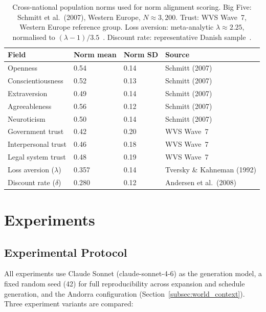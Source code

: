 \documentclass[a4paper,12pt]{article}
\begin{document}
\begin{table}[H]
\caption{Cross-national population norms used for norm alignment scoring.
Big Five: Schmitt et al.\ (2007), Western Europe, $N \approx 3{,}200$.
Trust: WVS Wave~7, Western Europe reference group.
Loss aversion: meta-analytic $\lambda \approx 2.25$, normalised to
$(\lambda - 1)/3.5$~\cite{tversky1992advances}.
Discount rate: representative Danish sample~\cite{andersen2008eliciting}.}
\label{tab:norms}
\begin{tabularx}{\textwidth}{lXXX}
\toprule
\textbf{Field} & \textbf{Norm mean} & \textbf{Norm SD} & \textbf{Source} \\
\midrule
Openness           & 0.54 & 0.14 & Schmitt (2007) \\
Conscientiousness  & 0.52 & 0.13 & Schmitt (2007) \\
Extraversion       & 0.49 & 0.14 & Schmitt (2007) \\
Agreeableness      & 0.56 & 0.12 & Schmitt (2007) \\
Neuroticism        & 0.50 & 0.14 & Schmitt (2007) \\
Government trust   & 0.42 & 0.20 & WVS Wave~7 \\
Interpersonal trust& 0.46 & 0.18 & WVS Wave~7 \\
Legal system trust & 0.48 & 0.19 & WVS Wave~7 \\
Loss aversion ($\lambda$) & 0.357 & 0.14 & Tversky \& Kahneman (1992) \\
Discount rate ($\delta$)  & 0.280 & 0.12 & Andersen et al.\ (2008) \\
\bottomrule
\end{tabularx}
\end{table}

\section{Experiments}
\label{sec:experiments}

\subsection{Experimental Protocol}
\label{subsec:exp_protocol}

All experiments use Claude Sonnet (claude-sonnet-4-6) as the generation
model, a fixed random seed (42) for full reproducibility across expansion
and schedule generation, and the Andorra configuration
(Section~\ref{subsec:world_context}). Three experiment variants are compared:
\end{document}

